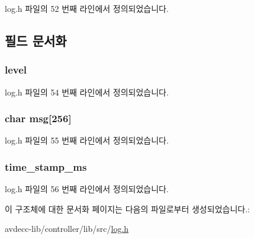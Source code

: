 log.\+h 파일의 52 번째 라인에서 정의되었습니다.



\subsection{필드 문서화}
\subsubsection[{\texorpdfstring{level}{level}}]{ level}\hypertarget{structavdecc__lib_1_1log_1_1log__data_a89eb5b8aeacf564f248d836e4ea62f8e}{}\label{structavdecc__lib_1_1log_1_1log__data_a89eb5b8aeacf564f248d836e4ea62f8e}


log.\+h 파일의 54 번째 라인에서 정의되었습니다.

\subsubsection[{\texorpdfstring{msg}{msg}}]{\setlength{\rightskip}{0pt plus 5cm}char msg\mbox{[}256\mbox{]}}\hypertarget{structavdecc__lib_1_1log_1_1log__data_a9f4ebc879ff493f64c1ed1cee362dee4}{}\label{structavdecc__lib_1_1log_1_1log__data_a9f4ebc879ff493f64c1ed1cee362dee4}


log.\+h 파일의 55 번째 라인에서 정의되었습니다.

\subsubsection[{\texorpdfstring{time\+\_\+stamp\+\_\+ms}{time_stamp_ms}}]{ time\+\_\+stamp\+\_\+ms}\hypertarget{structavdecc__lib_1_1log_1_1log__data_af3b0eb8fc59e142e89b53ab76175be29}{}\label{structavdecc__lib_1_1log_1_1log__data_af3b0eb8fc59e142e89b53ab76175be29}


log.\+h 파일의 56 번째 라인에서 정의되었습니다.



이 구조체에 대한 문서화 페이지는 다음의 파일로부터 생성되었습니다.\+:\begin{DoxyCompactItemize}
\item 
avdecc-\/lib/controller/lib/src/\hyperlink{log_8h}{log.\+h}\end{DoxyCompactItemize}
